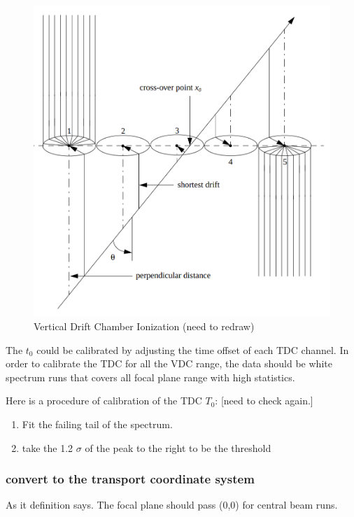 \begin{figure}
    \centering
    \includegraphics[scale = 0.25]{images/chap3/vdc_wire_ionize.png}
    \caption{Vertical Drift Chamber Ionization (need to redraw)}
    \label{fig:vdc_wire_ionization_cluster}
\end{figure}

The $t_0$ could be calibrated by adjusting the time offset of each TDC channel. In order to calibrate the TDC for all the VDC range, the data should be white spectrum runs that covers all focal plane range with high statistics. 

Here is a procedure of calibration of the TDC $T_0$: [need to check again.]
\begin{enumerate}
    \item Fit the failing tail of the spectrum. 
    \item take the 1.2 $\sigma$ of the peak to the right to be the threshold
\end{enumerate}

\subsubsection{convert to the transport coordinate system}
As it definition says. The focal plane should pass (0,0) for central beam runs. 

